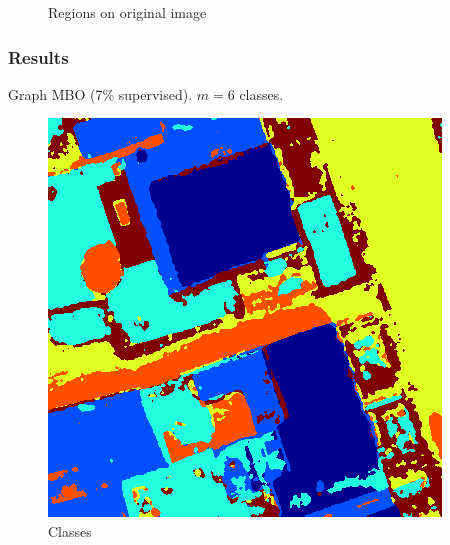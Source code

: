 \documentclass{beamer}
\begin{document}
\begin{frame}
\begin{figure}[ht]
\begin{minipage}[b]{0.45\linewidth}
      \caption{Regions on original image}
    \end{minipage}
  \end{figure}
\end{frame}


\begin{frame}
  \frametitle{Results}
  Graph MBO (7\% supervised). $m = 6$ classes.
  \begin{figure}[ht]
    \begin{minipage}[b]{0.45\linewidth}
      \centering
      \includegraphics[width=\textwidth]{./Images/DFC2015/MBO/classification.png}
      \caption{Classes}
    \end{minipage}
    \begin{minipage}[b]{0.45\linewidth}
      \centering

\end{minipage}
\end{figure}
\end{frame}
\end{document}
